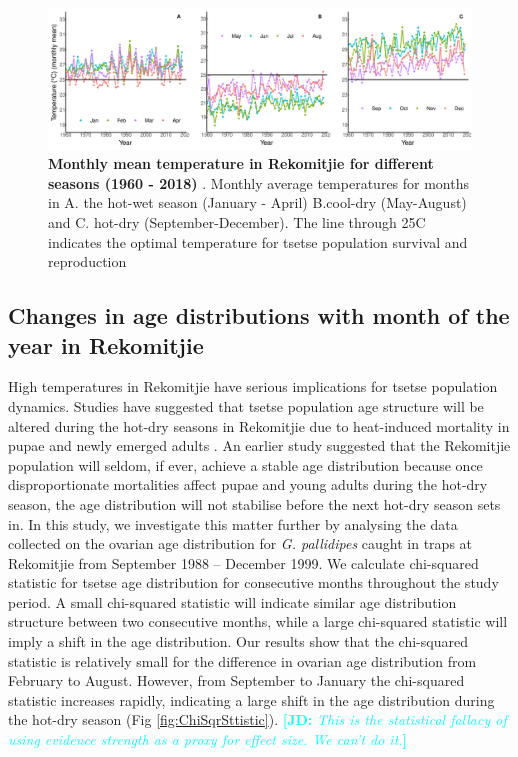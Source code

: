 \documentclass[12pt,a4paper]{article}
\newcommand{\comment}[3]{\textcolor{#1}{\textbf{[#2: }\textsl{#3}\textbf{]}}}
\newcommand{\jd}[1]{\comment{cyan}{JD}{#1}}
\begin{document}
\begin{figure}[hbt!]
	\centering
	\includegraphics[width=1.1\linewidth]{21April20CombineTemPlot}
	\caption{{\bf Monthly mean temperature in Rekomitjie for different seasons (1960 - 2018) }. Monthly average temperatures for months in A. the hot-wet season (January - April)  B.cool-dry (May-August) and C. hot-dry (September-December). The line through 25\degree C indicates the optimal temperature for tsetse population survival and reproduction}
	\label{fig:combineTem}
\end{figure}


\newpage
\subsection*{Changes in age distributions with month of the year in Rekomitjie}
High temperatures in Rekomitjie have serious implications for tsetse population dynamics. Studies have suggested that tsetse population age structure will be altered during the hot-dry seasons in Rekomitjie due to heat-induced mortality in pupae and newly emerged adults \cite{Hargrove2013b,hargrove2015mortality,Ackley2017}. An earlier study \cite{VanSickle1988} suggested that the Rekomitjie population will seldom, if ever, achieve a stable age distribution because once disproportionate mortalities affect pupae and young adults during the hot-dry season, the age distribution will not stabilise before the next hot-dry season sets in. In this study, we investigate this matter further by analysing the data collected on the ovarian age distribution for \textit{G. pallidipes} caught in traps at Rekomitjie from September 1988 – December 1999. We calculate chi-squared statistic for tsetse age distribution for consecutive months throughout the study period. A small chi-squared statistic will indicate similar age distribution structure between two consecutive months, while a large chi-squared statistic will imply a shift in the age distribution.  Our results show that the chi-squared statistic   is relatively small for the difference in ovarian age distribution from February to August. However, from September to January the chi-squared statistic increases rapidly, indicating a large shift in the age distribution during the hot-dry season (Fig \ref{fig:ChiSqrSttistic}). \jd{This is the statistical fallacy of using evidence strength as a proxy for effect size. We can't do it.}
\end{document}
